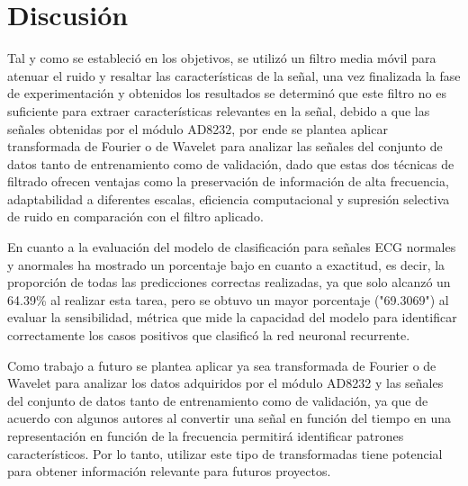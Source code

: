 \chapter{Discusión}
\label{chap:results}

Tal y como se estableció en los objetivos, se utilizó un filtro media móvil para atenuar el ruido y resaltar las características de la señal, una vez finalizada la fase de experimentación y obtenidos los resultados se determinó que este filtro no es suficiente para extraer características relevantes en la señal, debido a que las señales obtenidas por el módulo AD8232, por ende se plantea aplicar transformada de Fourier o de Wavelet para analizar las señales del conjunto de datos tanto de entrenamiento como de validación, dado que estas dos técnicas de filtrado ofrecen ventajas como la preservación de información de alta frecuencia, adaptabilidad a diferentes escalas, eficiencia computacional y supresión selectiva de ruido en comparación con el filtro aplicado.

En cuanto a la evaluación del modelo de clasificación para señales ECG normales y anormales ha mostrado un porcentaje bajo en cuanto a exactitud, es decir, la proporción de todas las predicciones correctas realizadas, ya que solo alcanzó un 64.39\% al realizar esta tarea, pero se obtuvo un mayor porcentaje ("69.3069") al evaluar la sensibilidad, métrica que mide la capacidad del modelo para identificar correctamente los casos positivos que clasificó la red neuronal recurrente.

Como trabajo a futuro se plantea aplicar ya sea transformada de Fourier o de Wavelet para analizar los datos adquiridos por el módulo AD8232 y las señales del conjunto de datos tanto de entrenamiento como de validación, ya que de acuerdo con algunos autores al convertir una señal en función del tiempo en una representación en función de la frecuencia permitirá identificar patrones característicos. Por lo tanto, utilizar este tipo de transformadas tiene potencial para obtener información relevante para futuros proyectos.
